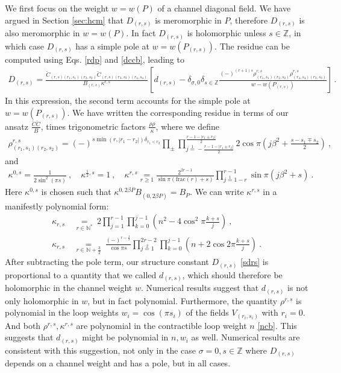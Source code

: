 \documentclass[12pt, a4paper]{article}
\begin{document}
We first focus on the weight $w=w(P)$ of a channel diagonal field. We have argued in Section \ref{sec:hcm} that $D_{(r,s)}$ is meromorphic in $P$, therefore $D_{(r,s)}$ is also meromorphic in $w=w(P)$. In fact $D_{(r,s)}$ is holomorphic unless $s\in \mathbb{Z}$, in which case $D_{(r,s)}$ has a simple pole at $w=w(P_{(r,s)})$. The residue can be computed using Eqs. \eqref{rdp} and \eqref{dccb}, leading to
\begin{align}
 D_{(r,s)} =  \frac{\check{C}_{(r,s)(r_1,s_1)(r_2,s_2)}\check{C}_{(r,s)(r_3,s_3)(r_4,s_4)}}{B_{(r,s)}\kappa^{r,s}} \left[d_{(r,s)}  - \delta_{\sigma,0}\delta_{s\in\mathbb{Z}}\frac{(-)^{(r+1)s}\rho^{r,s}_{(r_1,s_1)(r_2,s_2)}\rho^{r,s}_{(r_4,s_4)(r_3,s_3)}}{w-w(P_{(r,s)})}\right] \, .
 \label{sdrs}
\end{align}
In this expression, the second term accounts for the simple pole at $w=w(P_{(r,s)})$. We have written the corresponding residue in terms of our ansatz $\frac{\check{C}\check{C}}{B}$, times trigonometric factors $\frac{\rho\rho}{\kappa}$, where we define
\begin{align}
\rho^{r,s}_{(r_1,s_1)(r_2,s_2)}= (-)^{s\min(r,|r_1-r_2|)\delta_{r_1<r_2}} \prod_\pm \prod_{j\overset{1}{=}-\frac{r-1-|r_1\pm r_2|}{2}}^{\frac{r-1-|r_1\pm r_2|}{2}} 2\cos\pi\left(j\beta^2+\tfrac{s-s_1\mp s_2}{2}\right)\ ,
 \label{rhop}
\end{align}
and
\begin{align}
\kappa^{0,s} = \frac{1}{2\sin^2(\pi s)} \ , \quad \kappa^{\frac12,s}=1 \ , \quad
\kappa^{r,s} \underset{r\geq 1}{=} \frac{2^{2r-1}}{\sin\pi(\text{frac}(r)+s)}\prod_{j\overset{1}{=}1-r}^{r-1} \sin\pi(j\beta^2 +s) \ .
 \label{kappa}
\end{align}
Here $\kappa^{0,s}$ is chosen such that $\kappa^{0,2\beta P}B_{(0,2\beta P)}=B_P$. We can write $\kappa^{r,s}$ in a manifestly polynomial form:
\begin{align}
 \kappa_{r,s} \ &\underset{r\in \mathbb{N}^*}{=}\  2\prod_{j=1}^{r-1}\prod_{k=0}^{j-1} \left(n^2 -4\cos^2\pi \tfrac{k+s}{j}\right) \ ,
 \\
 \kappa_{r,s} \ &\underset{r\in \mathbb{N}+\frac32}{=}\ \frac{(-)^{r-\frac12}}{\cos\pi s} \prod_{j\overset{2}=1}^{2r-2} \prod_{k=0}^{j-1}\left(n+2\cos 2\pi \tfrac{k+s}{j}\right)\ .
\end{align}
After subtracting the pole term, our structure constant $D_{(r,s)}$ \eqref{sdrs} is proportional to a quantity that we called $d_{(r,s)}$, which should therefore be holomorphic in the channel weight $w$.
Numerical results suggest that $d_{(r,s)}$ is not only holomorphic in $w$, but in fact polynomial. Furthermore, the quantity $\rho^{r,s}$ is polynomial in the loop weights $w_i=\cos(\pi s_i)$ of the fields $V_{(r_i,s_i)}$ with $r_i=0$. And both $\rho^{r,s},\kappa^{r,s}$ are polynomial in the contractible loop weight $n$ \eqref{ncb}. This suggests that $d_{(r,s)}$ might be polynomial in $n,w_i$ as well. Numerical results are consistent with this suggestion, not only in the case $\sigma=0, s\in\mathbb{Z}$ where $D_{(r,s)}$ depends on a channel weight and has a pole, but in all cases.
\end{document}
